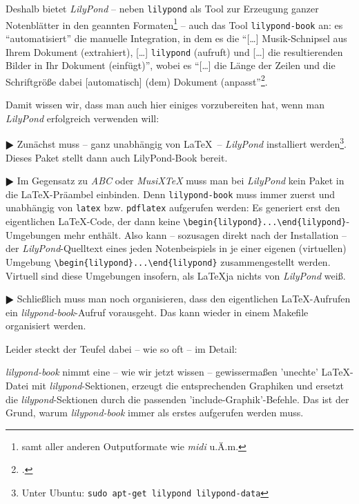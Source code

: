 Deshalb bietet \emph{LilyPond} -- neben \texttt{lilypond} als Tool zur Erzeugung
ganzer Notenblätter in den geannten Formaten\footnote{samt aller anderen
Outputformate wie \emph{midi} u.Ä.m.} -- auch das Tool \texttt{lilypond-book}
an: es \enquote{automatisiert} die manuelle Integration, in dem es die
\enquote{[\ldots] Musik-Schnipsel aus Ihrem Dokument (extrahiert), [\ldots]
\texttt{lilypond} (aufruft) und [\ldots] die resultierenden Bilder in Ihr
Dokument (einfügt)}, wobei es \enquote{[\ldots] die Länge der Zeilen und die
Schriftgröße dabei [automatisch] (dem) Dokument
(anpasst}\footcite[vgl.][20]{LilyPond2018e}.

Damit wissen wir, dass man auch hier einiges vorzubereiten hat, wenn man
\emph{LilyPond} erfolgreich verwenden will:

$\RHD$ Zunächst muss -- ganz unabhängig von \LaTeX\ -- \emph{LilyPond}
installiert werden\footnote{Unter Ubuntu: \texttt{sudo apt-get lilypond
lilypond-data}}. Dieses Paket stellt dann auch LilyPond-Book bereit.
  
$\RHD$ Im Gegensatz zu \emph{ABC} oder \emph{MusiX\TeX} muss man bei
\emph{LilyPond} kein Paket in die \LaTeX-Präambel einbinden. Denn
\texttt{lilypond-book} muss immer zuerst und unabhängig von \texttt{latex} bzw.
\texttt{pdflatex} aufgerufen werden: Es generiert erst den eigentlichen
\LaTeX-Code, der dann keine \verb|\begin{lilypond}...\end{lilypond}|-Umgebungen
mehr enthält. Also kann -- sozusagen direkt nach der Installation -- der
\emph{LilyPond}-Quelltext eines jeden Notenbeispiels in je einer eigenen
(virtuellen) Umgebung \verb|\begin{lilypond}...\end{lilypond}| zusammengestellt
werden. Virtuell sind diese Umgebungen insofern, als \LaTeX ja nichts von
\emph{LilyPond} weiß.

$\RHD$ Schließlich muss man noch organisieren, dass den eigentlichen
\LaTeX-Aufrufen ein \emph{lilypond-book}-Aufruf vorausgeht. Das kann wieder in
einem Makefile organisiert werden.

Leider steckt der Teufel dabei -- wie so oft -- im Detail: 

\emph{lilypond-book} nimmt eine -- wie wir jetzt wissen -- gewissermaßen
'unechte' \LaTeX-Datei mit \emph{lilypond}-Sektionen, erzeugt die entsprechenden
Graphiken und ersetzt die \emph{lilypond}-Sektionen durch die passenden
'include-Graphik'-Befehle. Das ist der Grund, warum \emph{lilypond-book} immer
als erstes aufgerufen werden muss.

